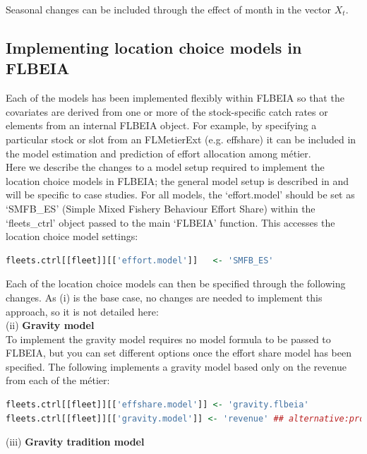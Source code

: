 \documentclass[12pt, halfline, a4paper]{ouparticle}
\begin{document}
Seasonal changes can be included through the effect of month in the vector
$X_t$. 

\subsection{Implementing location choice models in FLBEIA}
\label{sec:imp}

Each of the models has been implemented flexibly within FLBEIA so that the
covariates are derived from one or more of the stock-specific catch rates or
elements from an internal FLBEIA object. For example, by specifying a
particular stock or slot from an FLMetierExt (e.g. effshare) it can be included
in the model estimation and prediction of effort allocation among métier. \\

Here we describe the changes to a model setup required to implement the
location choice models in FLBEIA; the general model setup is described in
\cite{Garcia2017a} and will be specific to case studies. For all models, the
`effort.model' should be set as `SMFB\_ES' (Simple Mixed Fishery Behaviour
Effort Share) within the `fleets\_ctrl' object passed to the main `FLBEIA'
function. This accesses the location choice model settings:

\begin{lstlisting}[language=R]
fleets.ctrl[[fleet]][['effort.model']]   <- 'SMFB_ES'
\end{lstlisting} 

Each of the location choice models can then be specified through the following
changes. As (i) is the base case, no changes are needed to implement this
approach, so it is not detailed here: \\

(ii) \textbf{Gravity model} \\

To implement the gravity model requires no model formula to be passed to
FLBEIA, but you can set different options once the effort share model has been
specified. The following implements a gravity model based only on the revenue
from each of the métier:

\begin{lstlisting}[language=R]
fleets.ctrl[[fleet]][['effshare.model']] <- 'gravity.flbeia'
fleets.ctrl[[fleet]][['gravity.model']] <- 'revenue' ## alternative:profit 
\end{lstlisting}

(iii) \textbf{Gravity tradition model} \\
\end{document}
